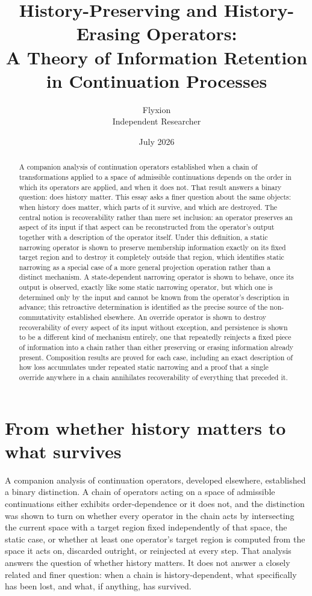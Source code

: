 \documentclass[11pt]{article}
\title{History-Preserving and History-Erasing Operators: \\ A Theory of Information Retention in Continuation Processes}
\author{Flyxion \\ \small Independent Researcher}
\date{July 2026}
\begin{document}
\maketitle

\begin{abstract}
A companion analysis of continuation operators established when a chain of transformations applied to a space of admissible continuations depends on the order in which its operators are applied, and when it does not. That result answers a binary question: does history matter. This essay asks a finer question about the same objects: when history does matter, which parts of it survive, and which are destroyed. The central notion is recoverability rather than mere set inclusion: an operator preserves an aspect of its input if that aspect can be reconstructed from the operator's output together with a description of the operator itself. Under this definition, a static narrowing operator is shown to preserve membership information exactly on its fixed target region and to destroy it completely outside that region, which identifies static narrowing as a special case of a more general projection operation rather than a distinct mechanism. A state-dependent narrowing operator is shown to behave, once its output is observed, exactly like some static narrowing operator, but which one is determined only by the input and cannot be known from the operator's description in advance; this retroactive determination is identified as the precise source of the non-commutativity established elsewhere. An override operator is shown to destroy recoverability of every aspect of its input without exception, and persistence is shown to be a different kind of mechanism entirely, one that repeatedly reinjects a fixed piece of information into a chain rather than either preserving or erasing information already present. Composition results are proved for each case, including an exact description of how loss accumulates under repeated static narrowing and a proof that a single override anywhere in a chain annihilates recoverability of everything that preceded it.
\end{abstract}

\newpage
\section{From whether history matters to what survives}

A companion analysis of continuation operators, developed elsewhere, established a binary distinction. A chain of operators acting on a space of admissible continuations either exhibits order-dependence or it does not, and the distinction was shown to turn on whether every operator in the chain acts by intersecting the current space with a target region fixed independently of that space, the static case, or whether at least one operator's target region is computed from the space it acts on, discarded outright, or reinjected at every step. That analysis answers the question of whether history matters. It does not answer a closely related and finer question: when a chain is history-dependent, what specifically has been lost, and what, if anything, has survived.
\end{document}
